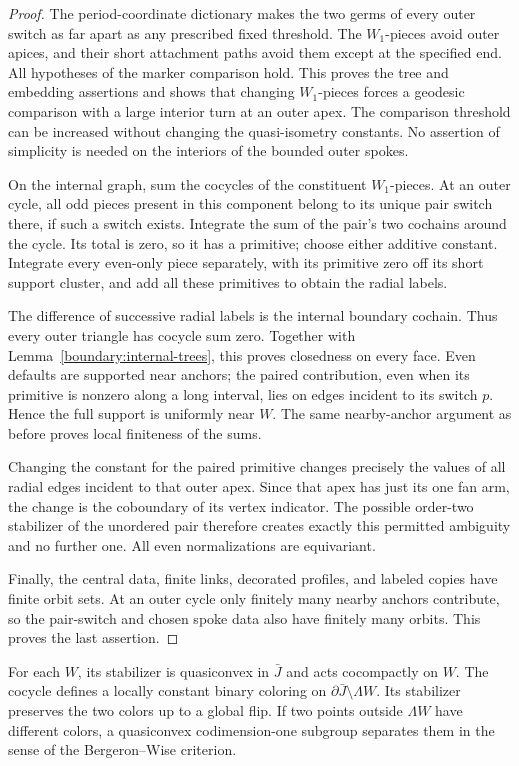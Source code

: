 \begin{proof}
The period-coordinate dictionary makes the two germs of every outer switch
as far apart as any prescribed fixed threshold. The $W_1$-pieces avoid
outer apices, and their short attachment paths avoid them except at the
specified end. All hypotheses of the marker comparison hold. This proves
the tree and embedding assertions and shows that changing $W_1$-pieces
forces a geodesic comparison with a large interior turn at an outer apex.
The comparison threshold can be increased without changing the
quasi-isometry constants. No assertion of simplicity is needed on the
interiors of the bounded outer spokes.

On the internal graph, sum the cocycles of the constituent $W_1$-pieces.
At an outer cycle, all odd pieces present in this component belong to its
unique pair switch there, if such a switch exists. Integrate the sum of
the pair's two cochains around the cycle. Its total is zero, so it has a
primitive; choose either additive constant. Integrate every even-only
piece separately, with its primitive zero off its short support cluster,
and add all these primitives to obtain the radial labels.

The difference of successive radial labels is the internal boundary
cochain. Thus every outer triangle has cocycle sum zero. Together with
Lemma~\ref{boundary:internal-trees}, this proves closedness on every face.
Even defaults are supported near anchors; the paired contribution, even
when its primitive is nonzero along a long interval, lies on edges incident
to its switch $p$. Hence the full support is uniformly near $W$. The same
nearby-anchor argument as before proves local finiteness of the sums.

Changing the constant for the paired primitive changes precisely the
values of all radial edges incident to that outer apex. Since that apex
has just its one fan arm, the change is the coboundary of its vertex
indicator. The possible order-two stabilizer of the unordered pair
therefore creates exactly this permitted ambiguity and no further one.
All even normalizations are equivariant.

Finally, the central data, finite links, decorated profiles, and labeled
copies have finite orbit sets. At an outer cycle only finitely many nearby
anchors contribute, so the pair-switch and chosen spoke data also have
finitely many orbits. This proves the last assertion.
\end{proof}

\begin{lemma}\label{boundary:sides}
For each $W$, its stabilizer is quasiconvex in $\bar J$ and acts
cocompactly on $W$. The cocycle defines a locally constant binary coloring
on $\partial\bar J\setminus\Lambda W$. Its stabilizer preserves the two
colors up to a global flip. If two points outside $\Lambda W$ have different
colors, a quasiconvex codimension-one subgroup separates them in the sense
of the Bergeron--Wise criterion.
\end{lemma}

